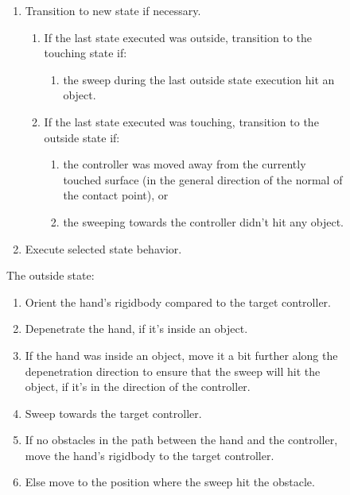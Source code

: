 \begin{figure}[H]
\small
\begin{enumerate}
\item Transition to new state if necessary.
\begin{enumerate}[noitemsep,label=\alph*.]
\item If the last state executed was outside, transition to the touching state if:
\begin{enumerate}[noitemsep,label=\arabic*.]
\item the sweep during the last outside state execution hit an object.
\end{enumerate}
\item If the last state executed was touching, transition to the outside state if:
\begin{enumerate}[noitemsep,label=\arabic*.]
\item the controller was moved away from the currently touched surface (in the general direction of the normal of the contact point), or
\item the sweeping towards the controller didn't hit any object.
\end{enumerate}
\end{enumerate}
\item Execute selected state behavior.
\end{enumerate}
\begin{minipage}[t]{0.49\textwidth}
\small
The outside state:
\begin{enumerate}[noitemsep]
\item Orient the hand's rigidbody compared to the target controller.
\item Depenetrate the hand, if it's inside an object.
\item If the hand was inside an object, move it a bit further along the depenetration direction to ensure that the sweep will hit the object, if it's in the direction of the controller.
\item Sweep towards the target controller.
\item If no obstacles in the path between the hand and the controller, move the hand's rigidbody to the target controller.
\item Else move to the position where the sweep hit the obstacle.
\end{enumerate}
\end{minipage}
\hspace{2em}%
\begin{minipage}[t]{0.49\textwidth}

\end{minipage}
\end{figure}
